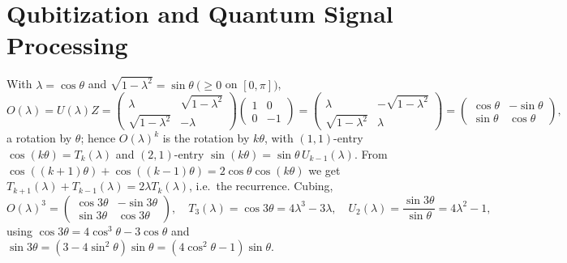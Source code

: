 \chapter{Qubitization and Quantum Signal Processing}

\begin{solution}
With $\lambda=\cos\theta$ and $\sqrt{1-\lambda^2}=\sin\theta\ (\ge0$ on $[0,\pi])$,
\[
  O(\lambda)=U(\lambda)Z
  =\begin{pmatrix}\lambda&\sqrt{1-\lambda^2}\\ \sqrt{1-\lambda^2}&-\lambda\end{pmatrix}
   \begin{pmatrix}1&0\\0&-1\end{pmatrix}
  =\begin{pmatrix}\lambda&-\sqrt{1-\lambda^2}\\ \sqrt{1-\lambda^2}&\lambda\end{pmatrix}
  =\begin{pmatrix}\cos\theta&-\sin\theta\\ \sin\theta&\cos\theta\end{pmatrix},
\]
a rotation by $\theta$; hence $O(\lambda)^k$ is the rotation by $k\theta$, with
$(1,1)$-entry $\cos(k\theta)=T_k(\lambda)$ and $(2,1)$-entry
$\sin(k\theta)=\sin\theta\,U_{k-1}(\lambda)$. From
$\cos((k+1)\theta)+\cos((k-1)\theta)=2\cos\theta\cos(k\theta)$ we get
$T_{k+1}(\lambda)+T_{k-1}(\lambda)=2\lambda T_k(\lambda)$, i.e.\ the recurrence.
Cubing,
\[
  O(\lambda)^3=\begin{pmatrix}\cos3\theta&-\sin3\theta\\ \sin3\theta&\cos3\theta\end{pmatrix},
  \quad
  T_3(\lambda)=\cos3\theta=4\lambda^3-3\lambda,\quad
  U_2(\lambda)=\frac{\sin3\theta}{\sin\theta}=4\lambda^2-1,
\]
using $\cos3\theta=4\cos^3\theta-3\cos\theta$ and
$\sin3\theta=(3-4\sin^2\theta)\sin\theta=(4\cos^2\theta-1)\sin\theta$.
\end{solution}

